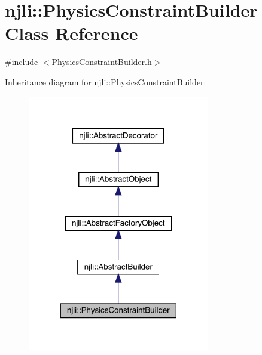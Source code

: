 \hypertarget{classnjli_1_1_physics_constraint_builder}{}\section{njli\+:\+:Physics\+Constraint\+Builder Class Reference}
\label{classnjli_1_1_physics_constraint_builder}


{\ttfamily \#include $<$Physics\+Constraint\+Builder.\+h$>$}



Inheritance diagram for njli\+:\+:Physics\+Constraint\+Builder\+:\nopagebreak
\begin{figure}[H]
\begin{center}
\leavevmode
\includegraphics[width=225pt]{classnjli_1_1_physics_constraint_builder__inherit__graph}
\end{center}
\end{figure}


